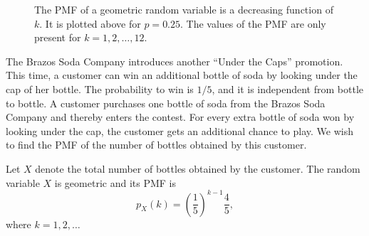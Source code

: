 \begin{figure}[ht]
\begin{center}
\end{center}
\caption{The PMF of a geometric random variable is a decreasing function of $k$.
It is plotted above for $p = 0.25$.
The values of the PMF are only present for $k = 1, 2, \ldots, 12$.}
\end{figure}

\begin{example}
The Brazos Soda Company introduces another ``Under the Caps'' promotion.
This time, a customer can win an additional bottle of soda by looking under the cap of her bottle.
The probability to win is $1/5$, and it is independent from bottle to bottle.
A customer purchases one bottle of soda from the Brazos Soda Company and thereby enters the contest.
For every extra bottle of soda won by looking under the cap, the customer gets an additional chance to play.
We wish to find the PMF of the number of bottles obtained by this customer.

Let $X$ denote the total number of bottles obtained by the customer.
The random variable $X$ is geometric and its PMF is
\begin{equation*}
p_X (k) = \left( \frac{1}{5} \right)^{k-1} \frac{4}{5},
\end{equation*}
where $k = 1, 2, \ldots$
\end{example}

